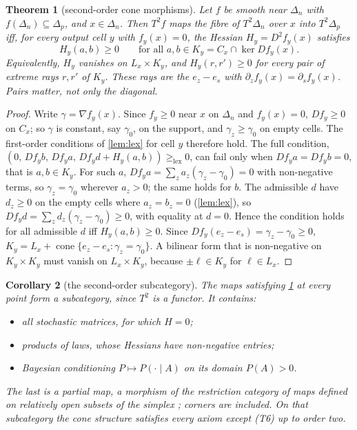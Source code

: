 \documentclass[11pt]{article}
\newtheorem{theorem}{Theorem}\newtheorem{proposition}[theorem]{Proposition}\newtheorem{lemma}[theorem]{Lemma}\newtheorem{corollary}[theorem]{Corollary}
\theoremstyle{definition}\newtheorem{definition}[theorem]{Definition}\newtheorem{remark}[theorem]{Remark}\newtheorem{example}[theorem]{Example}
\newcommand{\lex}{\ge_{\mathrm{lex}}}
\begin{document}
\begin{theorem}[second-order cone morphisms]\label{thm:nonaffine}
Let $f$ be smooth near $\Delta_n$ with $f(\Delta_n)\subseteq\Delta_p$, and $x\in\Delta_n$. Then $T^2f$ maps the fibre of $T^2\Delta_n$ over $x$
into $T^2\Delta_p$ iff, for every output cell $y$ with $f_y(x)=0$, the Hessian $H_y=D^2f_y(x)$ satisfies
\[
H_y(a,b)\ge0\qquad\text{for all }a,b\in K_y=C_x\cap\ker Df_y(x).
\]
Equivalently, $H_y$ vanishes on $L_x\times K_y$, and $H_y(r,r')\ge0$ for every pair of extreme rays $r,r'$ of $K_y$. These rays are the
$e_z-e_s$ with $\partial_zf_y(x)=\partial_sf_y(x)$. Pairs matter, not only the diagonal.
\end{theorem}

\begin{proof}
Write $\gamma=\nabla f_y(x)$. Since $f_y\ge0$ near $x$ on $\Delta_n$ and $f_y(x)=0$, $Df_y\ge0$ on $C_x$; so $\gamma$ is constant, say
$\gamma_0$, on the support, and $\gamma_z\ge\gamma_0$ on empty cells. The first-order conditions of \cref{lem:lex} for cell $y$ therefore
hold. The full condition, $(0,\,Df_yb,\,Df_ya,\,Df_yd+H_y(a,b))\lex0$, can fail only when $Df_ya=Df_yb=0$, that is $a,b\in K_y$. For
such $a$, $Df_ya=\sum_za_z(\gamma_z-\gamma_0)=0$ with non-negative terms, so $\gamma_z=\gamma_0$ wherever $a_z>0$; the same holds for $b$.
The admissible $d$ have $d_z\ge0$ on the empty cells where $a_z=b_z=0$ (\cref{lem:lex}), so
$Df_yd=\sum_zd_z(\gamma_z-\gamma_0)\ge0$, with equality at $d=0$. Hence the condition holds for all admissible $d$ iff
$H_y(a,b)\ge0$. Since $Df_y(e_z-e_s)=\gamma_z-\gamma_0\ge0$, $K_y=L_x+\operatorname{cone}\{e_z-e_s:\gamma_z=\gamma_0\}$. A bilinear form
that is non-negative on $K_y\times K_y$ must vanish on $L_x\times K_y$, because $\pm\ell\in K_y$ for $\ell\in L_x$.
\end{proof}

\begin{corollary}[the second-order subcategory]\label{cor:sub}
The maps satisfying \cref{thm:nonaffine} at every point form a subcategory, since $T^2$ is a functor. It contains:
\begin{itemize}
\item all stochastic matrices, for which $H=0$;
\item products of laws, whose Hessians have non-negative entries;
\item Bayesian conditioning $P\mapsto P(\cdot\mid A)$ on its domain $P(A)>0$.
\end{itemize}
The last is a partial map, a morphism of the restriction category of maps defined on relatively open subsets of the simplex
\cite{CockettCruttwellGallagher2011}; corners are included. On that subcategory the cone structure satisfies every axiom except (T6)
up to order two.
\end{corollary}
\end{document}
